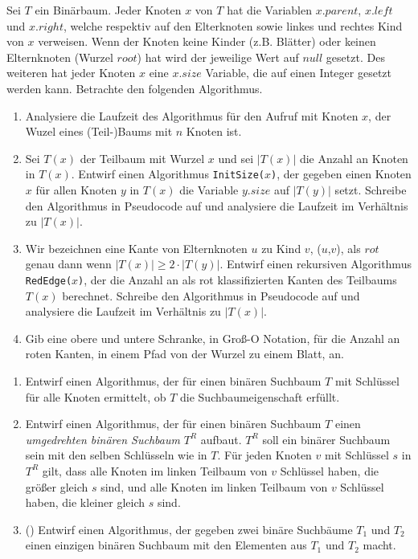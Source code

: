 \documentclass{uebung_cs}
\begin{document}
\begin{aufgabe}
	Sei $T$ ein Binärbaum.
	Jeder Knoten $x$ von $T$ hat die Variablen $x.parent$, $x.left$ und $x.right$, welche respektiv auf den Elterknoten sowie linkes und rechtes Kind von $x$ verweisen.
	Wenn der Knoten keine Kinder (z.B. Blätter) oder keinen Elternknoten (Wurzel $root$) hat wird der jeweilige Wert auf $null$ gesetzt.
	Des weiteren hat jeder Knoten $x$ eine $x.size$ Variable, die auf einen Integer gesetzt werden kann.
	Betrachte den folgenden Algorithmus.
	\begin{algorithmic}
		\ENDIF
	\end{algorithmic}
		
	\begin{enumerate}
		\item Analysiere die Laufzeit des Algorithmus für den Aufruf mit Knoten $x$, der Wuzel eines (Teil-)Baums mit $n$ Knoten ist.
		\item Sei $T(x)$ der Teilbaum mit Wurzel $x$ und sei $|T(x)|$ die Anzahl an Knoten in $T(x)$.
		Entwirf einen Algorithmus \texttt{InitSize($x$)}, der gegeben einen Knoten $x$ für allen Knoten $y$ in $T(x)$ die Variable $y.size$ auf $|T(y)|$ setzt.
		Schreibe den Algorithmus in Pseudocode auf und analysiere die Laufzeit im Verhältnis zu $|T(x)|$.
		\item Wir bezeichnen eine Kante von Elternknoten $u$ zu Kind $v$, ($u$,$v$), als $rot$ genau dann wenn $|T(x)| \geq 2\cdot|T(y)|$.
		Entwirf einen rekursiven Algorithmus \texttt{RedEdge($x$)}, der die Anzahl an als rot klassifizierten Kanten des Teilbaums $T(x)$ berechnet.
		Schreibe den Algorithmus in Pseudocode auf und analysiere die Laufzeit im Verhältnis zu $|T(x)|$.
		\item Gib eine obere und untere Schranke, in Groß-O Notation, für die Anzahl an roten Kanten, in einem Pfad von der Wurzel zu einem Blatt, an.
	\end{enumerate}
\end{aufgabe}

\begin{aufgabe}
	\begin{enumerate}
		\item Entwirf einen Algorithmus, der für einen binären Suchbaum $T$ mit Schlüssel für alle Knoten ermittelt, ob $T$ die Suchbaumeigenschaft erfüllt.
		\item Entwirf einen Algorithmus, der für einen binären Suchbaum $T$ einen \textit{umgedrehten binären Suchbaum} $T^R$ aufbaut.
		$T^R$ soll ein binärer Suchbaum sein mit den selben Schlüsseln wie in $T$.
		Für jeden Knoten $v$ mit Schlüssel $s$ in $T^R$ gilt, dass alle Knoten im linken Teilbaum von $v$ Schlüssel haben, die größer gleich $s$ sind, und alle Knoten im linken Teilbaum von $v$ Schlüssel haben, die kleiner gleich $s$ sind.
		\item (\hard) Entwirf einen Algorithmus, der gegeben zwei binäre Suchbäume $T_1$ und $T_2$ einen einzigen binären Suchbaum mit den Elementen aus $T_1$ und $T_2$ macht.
	\end{enumerate}
\end{aufgabe}
\end{document}
